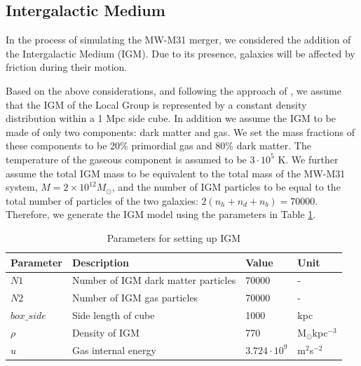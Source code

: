 \documentclass[a4paper,12pt, english]{article}
\begin{document}
\subsection{Intergalactic Medium}
\label{Intergalactic Medium}
In the process of simulating the MW-M31 merger, we considered the addition of the Intergalactic Medium (IGM). Due to its presence, galaxies will be affected by friction during their motion.\par
\smallskip
Based on the above considerations, and following the approach of \textcite{Cox_2008}, we assume that the IGM of the Local Group is represented by a constant density distribution within a 1 Mpc side cube. In addition we assume the IGM to be made of only two components: dark matter and gas. We set the mass fractions of these components to be 20\% primordial gas and 80\% dark matter. The temperature of the gaseous component is assumed  to be $3\cdot10^5$ K. We further assume the total IGM mass to be equivalent to the total mass of the MW-M31 system, \(M = 2 \times 10^{12} M_{\odot}\), and the number of IGM particles to be equal to the total number of particles of the two galaxies: $2(n_h+n_d+n_b) = 70000$. Therefore, we generate the IGM model using the parameters in Table \ref{igm-param}.

\begin{table}[]
\begin{tabular}{l|l|l|l}
Parameter        & Description                         &Value             & Unit               
\\ \hline
\(N1\)           & Number of IGM dark matter particles &70000             & -  
\\
\(N2\)           & Number of IGM gas particles         &70000             & -   
\\
\(box\_side\)     & Side length of cube                 &1000             & kpc    
\\
\(\rho\)         & Density of IGM                      &770               & M$_{\odot}$kpc$^{-3}$
\\
\(u\)            & Gas internal energy                &$3.724\cdot10^9$  & m$^2$s$^{-2}$
\\
\hline 
\end{tabular}
\centering
\caption{Parameters for setting up IGM}
\label{igm-param}
\end{table}
\end{document}
